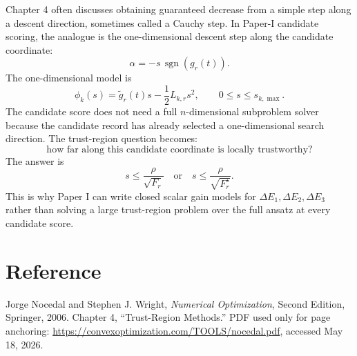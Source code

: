 \documentclass[10pt,twocolumn]{article}
\newcommand{\sgn}{\operatorname{sgn}}
\begin{document}
Chapter 4 often discusses obtaining guaranteed decrease from a simple step along a descent direction, sometimes called a Cauchy step. In Paper-I candidate scoring, the analogue is the one-dimensional descent step along the candidate coordinate:
\begin{equation}
\alpha=-s\,\sgn(g_r(t)).
\label{eq:cauchy_alpha}
\end{equation}
The one-dimensional model is
\begin{equation}
\phi_k(s)=\widetilde g_r(t)s-\frac12L_{k,r}s^2,
\qquad
0\le s\le s_{k,\max}.
\label{eq:cauchy_phi}
\end{equation}
The candidate score does not need a full \(n\)-dimensional subproblem solver because the candidate record has already selected a one-dimensional search direction. The trust-region question becomes:
\begin{equation}
\text{how far along this candidate coordinate is locally trustworthy?}
\label{eq:cauchy_question}
\end{equation}
The answer is
\begin{equation}
s\le\frac{\rho}{\sqrt{F_r}}
\quad\text{or}\quad
s\le\frac{\rho}{\sqrt{F_r^\star}}.
\label{eq:cauchy_answer}
\end{equation}
This is why Paper I can write closed scalar gain models for \(\Delta E_1,\Delta E_2,\Delta E_3\) rather than solving a large trust-region problem over the full ansatz at every candidate score.

\section*{Reference}

Jorge Nocedal and Stephen J. Wright, \emph{Numerical Optimization}, Second Edition, Springer, 2006. Chapter 4, ``Trust-Region Methods.'' PDF used only for page anchoring: \url{https://convexoptimization.com/TOOLS/nocedal.pdf}, accessed May 18, 2026.
\end{document}
